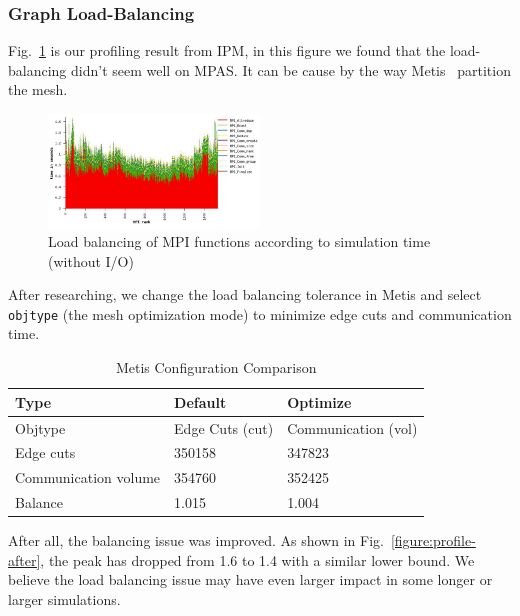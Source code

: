 
\subsubsection{Graph Load-Balancing}
Fig.~\ref{figure:profile-before} is our profiling result from IPM, in this figure we found that the load-balancing didn't seem well on MPAS. It can be cause by the way Metis~\cite{metis} partition the mesh. 

\begin{figure}[t]
    \centering
    \includegraphics[width=0.5\textwidth]{profileBefore.JPG} 
    \caption{Load balancing of MPI functions according to simulation time (without I/O)}
    \label{figure:profile-before}
\end{figure}

After researching, we change the load balancing tolerance in Metis and select \texttt{objtype} (the mesh optimization mode) to minimize edge cuts and communication time.

\begin{table}[t]
    \centering
    \caption{Metis Configuration Comparison}
    \begin{tabular}{lll}
        \toprule
        Type & Default & Optimize  \\
        \midrule
        Objtype & Edge Cuts (cut) & Communication (vol) \\
        Edge cuts & 350158 & 347823 \\
        Communication volume & 354760 & 352425 \\
        Balance & 1.015 & 1.004 \\
        \bottomrule
    \end{tabular}
    \label{table:metis-configuration}
\end{table}

After all, the balancing issue was improved. As shown in Fig.~\ref{figure:profile-after}, the peak has dropped from 1.6 to 1.4 with a similar lower bound. We believe the load balancing issue may have even larger impact in some longer or larger simulations.

